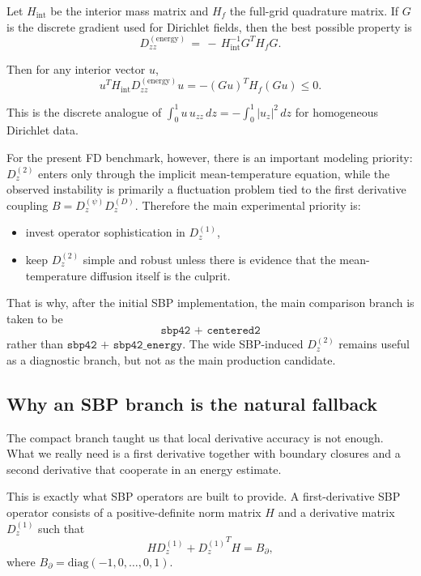 \documentclass[11pt]{article}
\newcommand{\Dzone}{D^{(1)}_z}
\newcommand{\Dztwo}{D^{(2)}_z}
\newcommand{\Hmat}{H}
\newcommand{\Gmat}{G}
\begin{document}
Let $\Hmat_{\mathrm{int}}$ be the interior mass matrix and $\Hmat_f$ the full-grid
quadrature matrix. If $\Gmat$ is the discrete gradient used for Dirichlet
fields, then the best possible property is
\begin{equation}
\boxed{
D^{(\mathrm{energy})}_{zz}
\,=\,
-\,\Hmat_{\mathrm{int}}^{-1}\Gmat^T \Hmat_f \Gmat.
}
\label{eq:D2_energy}
\end{equation}

Then for any interior vector $u$,
\begin{equation}
u^T \Hmat_{\mathrm{int}} D^{(\mathrm{energy})}_{zz} u
=
- (\Gmat u)^T \Hmat_f (\Gmat u)
\le 0.
\label{eq:energy_dissipation}
\end{equation}

This is the discrete analogue of
\(
\int_0^1 u\,u_{zz}\,dz = -\int_0^1 |u_z|^2\,dz
\)
for homogeneous Dirichlet data.

For the present FD benchmark, however, there is an important modeling priority:
\(\Dztwo\) enters only through the implicit mean-temperature equation, while the
observed instability is primarily a fluctuation problem tied to the first
derivative coupling \( B = D_z^{(\psi)} D_z^{(D)} \). Therefore the main
experimental priority is:
\begin{itemize}[nosep]
\item invest operator sophistication in \(\Dzone\),
\item keep \(\Dztwo\) simple and robust unless there is evidence that the
  mean-temperature diffusion itself is the culprit.
\end{itemize}

That is why, after the initial SBP implementation, the main comparison branch
is taken to be
\[
\boxed{
\texttt{sbp42 + centered2}
}
\]
rather than \(\texttt{sbp42 + sbp42\_energy}\). The wide SBP-induced
\(\Dztwo\) remains useful as a diagnostic branch, but not as the main
production candidate.

\subsection{Why an SBP branch is the natural fallback}

The compact branch taught us that local derivative accuracy is not enough.
What we really need is a first derivative together with boundary closures and a
second derivative that cooperate in an energy estimate.

This is exactly what SBP operators are built to provide. A first-derivative SBP
operator consists of a positive-definite norm matrix $\Hmat$ and a derivative
matrix $\Dzone$ such that
\begin{equation}
\boxed{
\Hmat \Dzone + {\Dzone}^T \Hmat = B_{\partial},
}
\label{eq:sbp_identity}
\end{equation}
where
\(
B_{\partial} = \mathrm{diag}(-1,0,\dots,0,1).
\)
\end{document}
